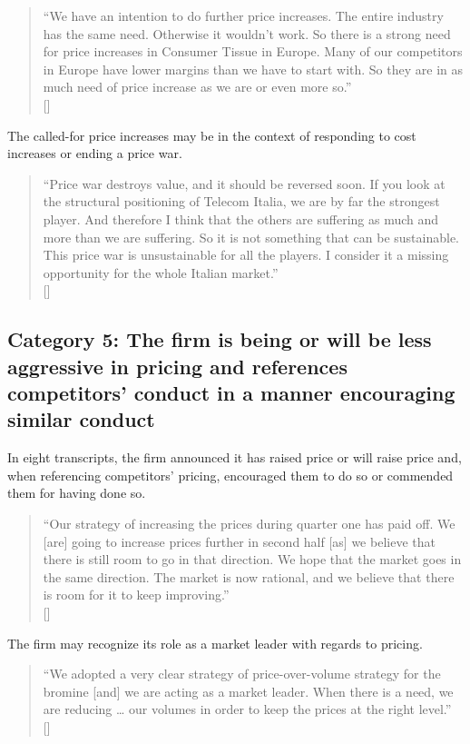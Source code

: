 \begin{quote}
``We have an intention to do further price increases. The entire industry has the same need. Otherwise it wouldn't work. So there is a strong need for price increases in Consumer Tissue in Europe. Many of our competitors in Europe have lower margins than we have to start with. So they are in as much need of price increase as we are or even more so.'' \\
\mbox{[]}
\end{quote}

The called-for price increases may be in the context of responding to cost increases or ending a price war.


\begin{quote}
``Price war destroys value, and it should be reversed soon. If you look at the structural positioning of Telecom Italia, we are by far the strongest player. And therefore I think that the others are suffering as much and more than we are suffering. So it is not something that can be sustainable. This price war is unsustainable for all the players. I consider it a missing opportunity for the whole Italian market.'' \\
\mbox{[]}
\end{quote}

\subsection{Category 5: The firm is being or will be less aggressive in pricing and references competitors' conduct in a manner encouraging similar conduct}
In eight transcripts, the firm announced it has raised price or will raise price and, when referencing competitors' pricing, encouraged them to do so or commended them for having done so.

\begin{quote}
``Our strategy of increasing the prices during quarter one has paid off. We [are] going to increase prices further in second half [as] we believe that there is still room to go in that direction. We hope that the market goes in the same direction. The market is now rational, and we believe that there is room for it to keep improving.'' \\
\mbox{[]}
\end{quote}


The firm may recognize its role as a market leader with regards to pricing.

\begin{quote}
``We adopted a very clear strategy of price-over-volume strategy for the bromine [and] we are acting as a market leader. When there is a need, we are reducing … our volumes in order to keep the prices at the right level.'' \\
\mbox{[]}
\end{quote}
